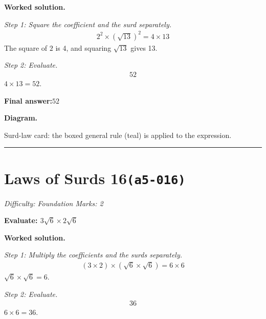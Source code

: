 \documentclass[11pt]{article}
\newcommand{\question}[1]{\par\medskip\noindent\textbf{#1}\par}
\begin{document}
\textbf{Worked solution.}

\textit{Step 1: Square the coefficient and the surd separately.}
\[\begin{gathered}
2^2 \times (\sqrt{13})^2 = 4 \times 13
\end{gathered}\]
The square of \( 2 \) is 4, and squaring \( \sqrt{13} \) gives 13.

\textit{Step 2: Evaluate.}
\[\begin{gathered}
52
\end{gathered}\]
\( 4 \times 13 = 52 \).

\begin{answerbox}
\textbf{Final answer:}\quad \(\displaystyle 52\)
\end{answerbox}
\textbf{Diagram.}

\begin{center}
\end{center}
\small Surd-law card: the boxed general rule (teal) is applied to the expression.\normalsize

\medskip\hrule

\section*{Laws of Surds 16\quad\small\texttt{(a5-016)}}
\textit{Difficulty: Foundation \quad\textbar\quad Marks: 2}

\question{Evaluate: \( 3\sqrt{6} \times 2\sqrt{6} \)}

\textbf{Worked solution.}

\textit{Step 1: Multiply the coefficients and the surds separately.}
\[\begin{gathered}
(3 \times 2) \times (\sqrt{6} \times \sqrt{6}) = 6 \times 6
\end{gathered}\]
\( \sqrt{6} \times \sqrt{6} = 6 \).

\textit{Step 2: Evaluate.}
\[\begin{gathered}
36
\end{gathered}\]
\( 6 \times 6 = 36 \).
\end{document}
